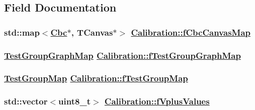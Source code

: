 \subsection{Field Documentation}
\hypertarget{class_calibration_e47a517af22b6c01652d8f5d5bd3ae20}{
\subsubsection[fCbcCanvasMap]{\setlength{\rightskip}{0pt plus 5cm}std::map$<$\hyperlink{class_ph2___hw_description_1_1_cbc}{Cbc}$\ast$, TCanvas$\ast$$>$ \hyperlink{class_calibration_e47a517af22b6c01652d8f5d5bd3ae20}{Calibration::f\-Cbc\-Canvas\-Map}}}
\label{class_calibration_e47a517af22b6c01652d8f5d5bd3ae20}


\hypertarget{class_calibration_7598aa1e8dab58e452923e54909f8a8e}{
\subsubsection[fTestGroupGraphMap]{\setlength{\rightskip}{0pt plus 5cm}\hyperlink{_channel_8h_1be8cf31d2544b84debee2220beeb318}{Test\-Group\-Graph\-Map} \hyperlink{class_calibration_7598aa1e8dab58e452923e54909f8a8e}{Calibration::f\-Test\-Group\-Graph\-Map}}}
\label{class_calibration_7598aa1e8dab58e452923e54909f8a8e}


\hypertarget{class_calibration_c79d5ebc2766ebc9c5faf384a05581b0}{
\subsubsection[fTestGroupMap]{\setlength{\rightskip}{0pt plus 5cm}\hyperlink{_channel_8h_1fc681fc13cd077738e86a5fbc1104d4}{Test\-Group\-Map} \hyperlink{class_calibration_c79d5ebc2766ebc9c5faf384a05581b0}{Calibration::f\-Test\-Group\-Map}}}
\label{class_calibration_c79d5ebc2766ebc9c5faf384a05581b0}


\hypertarget{class_calibration_d6fedaf43e799f69b7fd46d9347cc536}{
\subsubsection[fVplusValues]{\setlength{\rightskip}{0pt plus 5cm}std::vector$<$uint8\_\-t$>$ \hyperlink{class_calibration_d6fedaf43e799f69b7fd46d9347cc536}{Calibration::f\-Vplus\-Values}}}
\label{class_calibration_d6fedaf43e799f69b7fd46d9347cc536}




